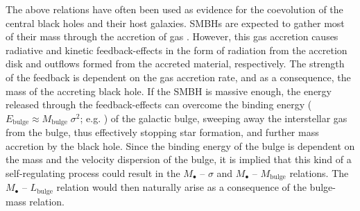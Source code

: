 \documentclass[english, twoside]{HYgradu}
\begin{document}
The above relations have often been used as evidence for the coevolution of the central black holes and their host galaxies. SMBHs are expected to gather most of their mass through the accretion of gas \citep{Soltan1982}. However, this gas accretion causes radiative and kinetic feedback-effects in the form of radiation from the accretion disk and outflows formed from the accreted material, respectively. The strength of the feedback is dependent on the gas accretion rate, and as a consequence, the mass of the accreting black hole. If the SMBH is massive enough, the energy released through the feedback-effects can overcome the binding energy ($E_\mathrm{bulge} \approx M_\mathrm{bulge} \; \sigma^2$; e.g. \citealt{Fabian2012}) of the galactic bulge, sweeping away the interstellar gas from the bulge, thus effectively stopping star formation, and further mass accretion by the black hole. Since the binding energy of the bulge is dependent on the mass and the velocity dispersion of the bulge, it is implied that this kind of a self-regulating process could result in the $M_\bullet$ – $\sigma$ and $M_\bullet$ – $M_\mathrm{bulge}$ relations. The $M_\bullet$ – $L_\mathrm{bulge}$ relation would then naturally arise as a consequence of the bulge-mass relation.
\end{document}
